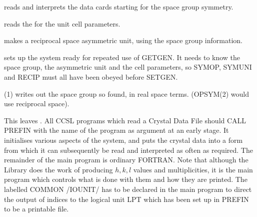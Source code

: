 \pn 
\begin{list} {} {\setlength{\labelwidth}{2 cm}
  \setlength{\parsep}{-1ex}
  \setlength{\leftmargin}{\labelwidth}}
\item[\stlink{s}{SYMOP} \hfill] reads and interprets the data cards starting  for the space group
symmetry.
\item[\stlink{r}{RECIP} \hfill] reads the  for the unit cell parameters.
\item[\stlink{s}{SYMUNI} \hfill] makes a reciprocal space asymmetric unit, using the space group
information.
\item[\stlink{s}{SETGEN} \hfill] sets up the system ready for repeated use of GETGEN.  It needs
to know the space group, the asymmetric unit and the cell parameters,
so SYMOP, SYMUNI and RECIP must all have been obeyed before SETGEN.
\item[\stlink{o}{OPSYM}(1) \hfill] writes out the space group so found, in real space terms. 
 (OPSYM(2) would use reciprocal space).\end{list}
\pn 
This leaves .  All CCSL programs which read a Crystal Data File
should CALL PREFIN with the
name of the program as argument at an early
stage.  It initialises various aspects of the system, and puts the crystal
data into a form from which it can subsequently be read and interpreted
as often as required. 
\pn 
The remainder of the main program is ordinary FORTRAN.  Note that
although the Library does the work of producing $h,k,l$ values and
multiplicities, it is the main program which controls what is done with
them and how they are printed. The labelled COMMON /IOUNIT/ has to be
declared in the main program to direct the output of indices 
to the logical unit LPT which has been set up in PREFIN to be a printable file.
\p\pagebreak[8]
